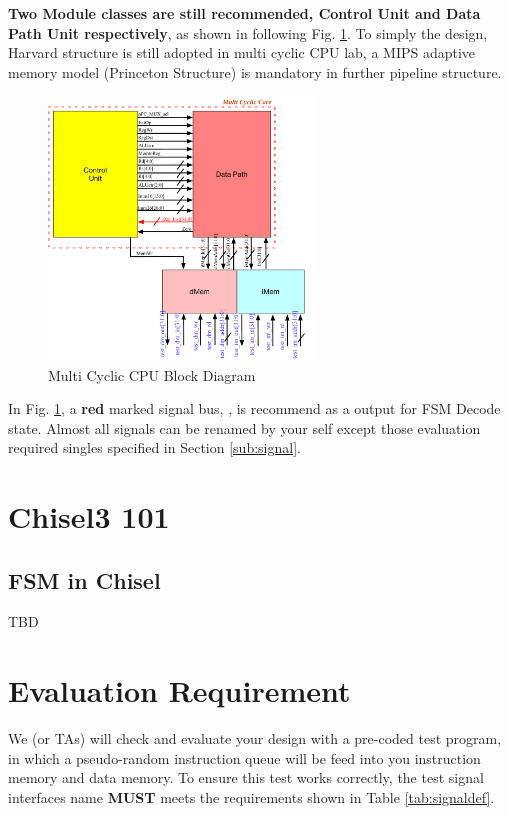 \documentclass[a4paper]{article}
\begin{document}
\textbf{Two Module classes are still recommended, Control Unit and Data Path Unit respectively}, as shown in following Fig. \ref{fig:modules}. To simply the design, Harvard structure is still adopted in multi cyclic CPU lab, a MIPS adaptive memory model (Princeton Structure) is mandatory in further pipeline structure.  
\begin{figure}[ht]
 \centering
 \includegraphics[height=7cm]{images/l2modules.pdf}
 \caption{Multi Cyclic CPU Block Diagram}
 \label{fig:modules}
\end{figure}
In Fig. \ref{fig:modules}, a \textbf{red} marked signal bus, , is recommend as a  output for FSM Decode state. Almost all signals can be renamed by your self except those evaluation required singles specified in Section \ref{sub:signal}.

\newpage
\section{Chisel3 101} \label{chisel3}%
\subsection{FSM in Chisel}\label{sub:FSM}
TBD


\newpage
\section{Evaluation Requirement} \label{sec:Functions}%
We (or TAs) will check and evaluate your design with a pre-coded test program, in which a pseudo-random instruction queue will be feed into you instruction memory and data memory. To ensure this test works correctly, the test signal interfaces name \textbf{MUST} meets the requirements shown in Table \ref{tab:signaldef}.
\end{document}
